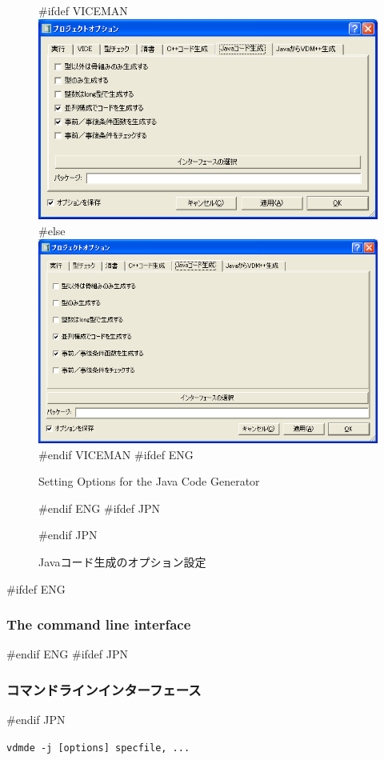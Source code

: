 \documentclass[\pformat,12pt]{article}
\newcommand{\vdmde}{vdmde}
\newcommand{\vdmde}{vppde}
\begin{document}
\begin{figure}[tbh]
\begin{center}
#ifdef VICEMAN
\includegraphics[width=12cm]{jcgOptions-vice.png}
#else
\includegraphics[width=12cm]{jcgOptions.png}
#endif VICEMAN
#ifdef ENG
\caption{Setting Options for the Java Code Generator}
#endif ENG
#ifdef JPN
\caption{Javaコード生成のオプション設定}
#endif JPN
\label{fig:optjcg}
\end{center}
\end{figure}

#ifdef ENG
\subsubsection{The command line interface}
#endif ENG
#ifdef JPN
\subsubsection{コマンドラインインターフェース}
#endif JPN

{\tt \vdmde\ -j [options] specfile, ...}
\end{document}
